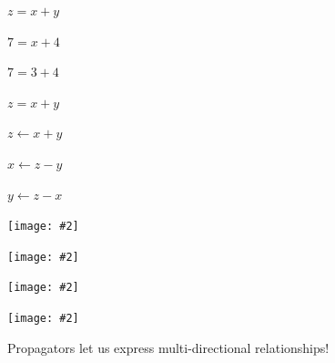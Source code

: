 \documentclass[usenames,dvipsnames,svgnames,table,aspectratio=1610,mathserif]{beamer}
\newcommand{\nl}{\vspace{\baselineskip}}
\newcommand{\imageslide}[2][1]{{
\begin{frame}\begin{center}
\texttt{[image: \#2]}
\end{center}\end{frame}
}}
\begin{document}
\begin{frame}
  \begin{center}
    \begin{LARGE}
      $z = x + y$
    \end{LARGE}
  \end{center}
\end{frame}


\begin{frame}
  \begin{center}
    \begin{LARGE}
      $7 = x + 4$
    \end{LARGE}
  \end{center}
\end{frame}


\begin{frame}
  \begin{center}
    \begin{LARGE}
      $7 = 3 + 4$
    \end{LARGE}
  \end{center}
\end{frame}


\begin{frame}
  \begin{center}
    \begin{LARGE}
      $z = x + y$
    \end{LARGE}
  \end{center}
\end{frame}


\begin{frame}
  \begin{center}
    \begin{LARGE}
      $z \leftarrow x + y$

      \nl

      $x \leftarrow z - y$

      \nl

      $y \leftarrow z - x$

    \end{LARGE}
  \end{center}
\end{frame}


\imageslide{badd1.pdf}
\imageslide{badd2.pdf}
\imageslide{badd3.pdf}
\imageslide{badd4.pdf}


\begin{frame}
\begin{center}
{\LARGE Propagators let us express multi-directional relationships!}
\end{center}
\end{frame}
\end{document}
